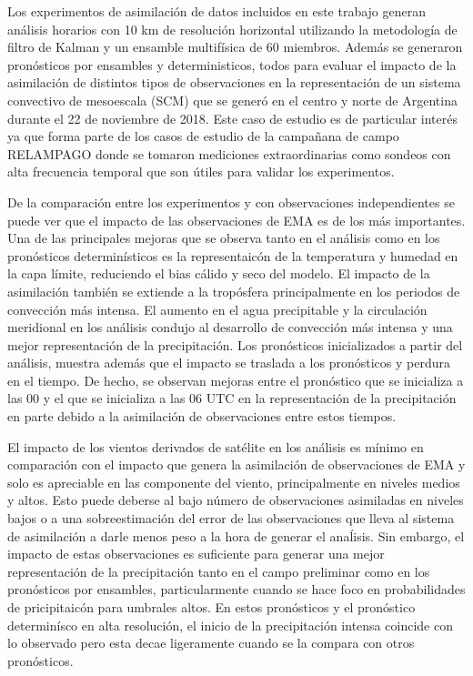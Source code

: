 \documentclass[12pt,oneside,a4paper]{reedthesis}
\begin{document}
Los experimentos de asimilación de datos incluidos en este trabajo generan análisis horarios con 10 km de resolución horizontal utilizando la metodología de filtro de Kalman y un ensamble multifísica de 60 miembros. Además se generaron pronósticos por ensambles y deterministicos, todos para evaluar el impacto de la asimilación de distintos tipos de observaciones en la representación de un sistema convectivo de mesoescala (SCM) que se generó en el centro y norte de Argentina durante el 22 de noviembre de 2018. Este caso de estudio es de particular interés ya que forma parte de los casos de estudio de la campañana de campo RELAMPAGO donde se tomaron mediciones extraordinarias como sondeos con alta frecuencia temporal que son útiles para validar los experimentos.

De la comparación entre los experimentos y con observaciones independientes se puede ver que el impacto de las observaciones de EMA es de los más importantes. Una de las principales mejoras que se observa tanto en el análisis como en los pronósticos determinísticos es la representaicón de la temperatura y humedad en la capa límite, reduciendo el bias cálido y seco del modelo. El impacto de la asimilación también se extiende a la tropósfera principalmente en los periodos de convección más intensa. El aumento en el agua precipitable y la circulación meridional en los análisis condujo al desarrollo de convección más intensa y una mejor representación de la precipitación. Los pronósticos inicializados a partir del análisis, muestra además que el impacto se traslada a los pronósticos y perdura en el tiempo. De hecho, se observan mejoras entre el pronóstico que se inicializa a las 00 y el que se inicializa a las 06 UTC en la representación de la precipitación en parte debido a la asimilación de observaciones entre estos tiempos.

El impacto de los vientos derivados de satélite en los análisis es mínimo en comparación con el impacto que genera la asimilación de observaciones de EMA y solo es apreciable en las componente del viento, principalmente en niveles medios y altos. Esto puede deberse al bajo número de observaciones asimiladas en niveles bajos o a una sobreestimación del error de las observaciones que lleva al sistema de asimilación a darle menos peso a la hora de generar el anaĺisis. Sin embargo, el impacto de estas observaciones es suficiente para generar una mejor representación de la precipitación tanto en el campo preliminar como en los pronósticos por ensambles, particularmente cuando se hace foco en probabilidades de pricipitaicón para umbrales altos. En estos pronósticos y el pronóstico determinísco en alta resolución, el inicio de la precipitación intensa coincide con lo observado pero esta decae ligeramente cuando se la compara con otros pronósticos.
\end{document}
